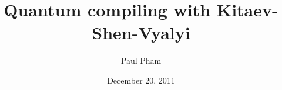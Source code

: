\documentclass[twocolumn,10pt]{article}
\title{Quantum compiling with Kitaev-Shen-Vyalyi}
\date{December 20, 2011}
\author{Paul Pham}
\theoremstyle{plain}
\begin{document}
\newcommand{\braket}[2]{\langle #1|#2 \rangle}
\newcommand{\normtwo}{\frac{1}{\sqrt{2}}}
\newcommand{\norm}[1]{\parallel #1 \parallel}

\maketitle







%





%











\end{document}
